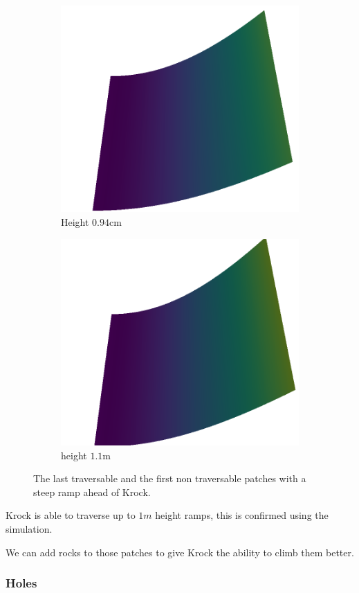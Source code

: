 \documentclass[../document.tex]{subfiles}
\begin{document}
\begin{figure}[H]
\begin{subfigure}[b]{0.33\textwidth}
    \end{subfigure}   
    \begin{subfigure}[b]{0.33\textwidth}
        \includegraphics[width=\linewidth]{../img/5/custom_patches/ramp/ramp-6-3d.png}
    \caption{Height $0.94$cm}
    \end{subfigure}   
    \begin{subfigure}[b]{0.33\textwidth}
        \includegraphics[width=\linewidth]{../img/5/custom_patches/ramp/ramp-7-3d}
        \caption{height $1.1$m}
    \end{subfigure}   
\caption{The last traversable and the first non traversable patches with a steep ramp ahead of Krock.}    
\end{figure}
Krock is able to traverse up to $1m$ height ramps, this is confirmed using the simulation.

We can add rocks to those patches to give Krock the ability to climb them better. 

\subsubsection{Holes}
\end{document}
